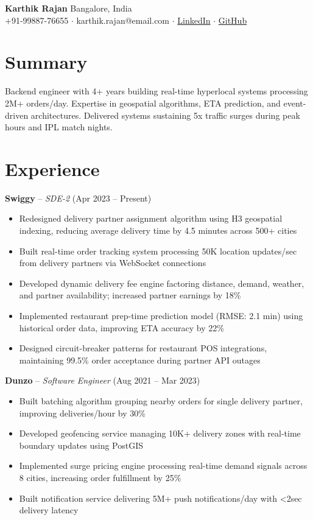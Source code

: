 \documentclass[10pt,a4paper]{article}
\begin{document}
{\Large\bfseries Karthik Rajan} \hfill {\small\color{accent} Bangalore, India}\\
{\small +91-99887-76655 $\cdot$ karthik.rajan@email.com $\cdot$ \href{https://linkedin.com/in/karthikrajan}{LinkedIn} $\cdot$ \href{https://github.com/karthikrajan}{GitHub}}

\section{Summary}

Backend engineer with 4+ years building real-time hyperlocal systems processing 2M+ orders/day. Expertise in geospatial algorithms, ETA prediction, and event-driven architectures. Delivered systems sustaining 5x traffic surges during peak hours and IPL match nights.

\section{Experience}

\textbf{Swiggy} -- \textit{SDE-2} (Apr 2023 -- Present)
\begin{itemize}
    \item Redesigned delivery partner assignment algorithm using H3 geospatial indexing, reducing average delivery time by 4.5 minutes across 500+ cities
    \item Built real-time order tracking system processing 50K location updates/sec from delivery partners via WebSocket connections
    \item Developed dynamic delivery fee engine factoring distance, demand, weather, and partner availability; increased partner earnings by 18\%
    \item Implemented restaurant prep-time prediction model (RMSE: 2.1 min) using historical order data, improving ETA accuracy by 22\%
    \item Designed circuit-breaker patterns for restaurant POS integrations, maintaining 99.5\% order acceptance during partner API outages
\end{itemize}

\textbf{Dunzo} -- \textit{Software Engineer} (Aug 2021 -- Mar 2023)
\begin{itemize}
    \item Built batching algorithm grouping nearby orders for single delivery partner, improving deliveries/hour by 30\%
    \item Developed geofencing service managing 10K+ delivery zones with real-time boundary updates using PostGIS
    \item Implemented surge pricing engine processing real-time demand signals across 8 cities, increasing order fulfillment by 25\%
    \item Built notification service delivering 5M+ push notifications/day with <2sec delivery latency
\end{itemize}
\end{document}
